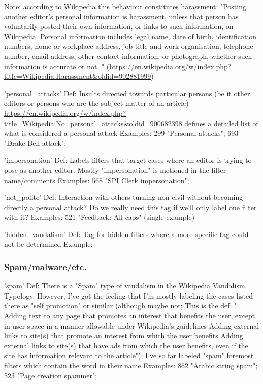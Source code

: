 Note: according to Wikipedia this behaviour constitutes harassment: "Posting another editor's personal information is harassment, unless that person has voluntarily posted their own information, or links to such information, on Wikipedia. Personal information includes legal name, date of birth, identification numbers, home or workplace address, job title and work organisation, telephone number, email address, other contact information, or photograph, whether such information is accurate or not. " (\url{https://en.wikipedia.org/w/index.php?title=Wikipedia:Harassment&oldid=902881999})

'personal\_attacks'
  Def: Insults directed towards particular persons (be it other editors or persons who are the subject matter of an article)
  \url{https://en.wikipedia.org/w/index.php?title=Wikipedia:No_personal_attacks&oldid=900682398} defines a detailed list of what is considered a personal attack
  Examples: 299 "Personal attacks"; 693 "Drake Bell attack";

'impersonation'
  Def: Labels filters that target cases where an editor is trying to pose as another editor. Mostly "impersonation" is metioned in the filter name/comments
  Examples: 568 "SPI Clerk impersonation";

'not\_polite'
  Def: Interaction with others turning non-civil without becoming directly a personal attack? Do we really need this tag if we'll only label one filter with it?
  Examples: 521 "Feedback: All caps" (single example)

'hidden\_vandalism'
 Def: Tag for hidden filters where a more specific tag could not be determined
 Example:


\subsubsection{Spam/malware/etc.}

'spam'
  Def: There is a "Spam" type of vandalism in the Wikipedia Vandalism Typology. However, I've got the feeling that I'm mostly labeling the cases listed there as "self promotion" or similar (although maybe not; This is the def: "    Adding text to any page that promotes an interest that benefits the user, except in user space in a manner allowable under Wikipedia's guidelines
    Adding external links to site(s) that promote an interest from which the user benefits
    Adding external links to site(s) that have ads from which the user benefits, even if the site has information relevant to the article");
  I've so far labeled "spam" foremost filters which contain the word in their name
  Examples: 862 "Arabic string spam";  523 "Page creation spammer";

